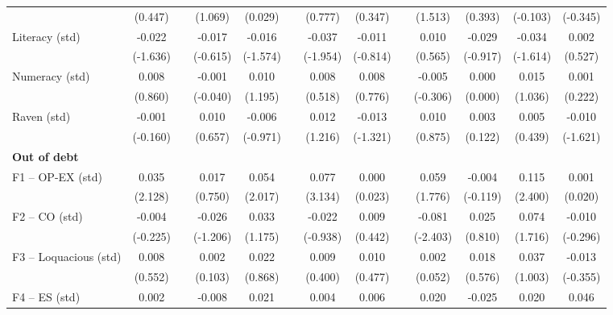 \begin{table}[htbp]
{\begin{tabular}{lcccccccccccc}
          & (0.447) &       & (1.069) & (0.029) &       & (0.777) & (0.347) &       & (1.513) & (0.393) & (-0.103) & (-0.345) \\
    Literacy (std) & -0.022 &       & -0.017 & -0.016 &       & \cellcolor[rgb]{ 1,  1,  0}-0.037 & -0.011 &       & 0.010 & -0.029 & -0.034 & 0.002 \\
          & (-1.636) &       & (-0.615) & (-1.574) &       & (-1.954) & (-0.814) &       & (0.565) & (-0.917) & (-1.614) & (0.527) \\
    Numeracy (std) & 0.008 &       & -0.001 & 0.010 &       & 0.008 & 0.008 &       & -0.005 & 0.000 & 0.015 & 0.001 \\
          & (0.860) &       & (-0.040) & (1.195) &       & (0.518) & (0.776) &       & (-0.306) & (0.000) & (1.036) & (0.222) \\
    Raven (std) & -0.001 &       & 0.010 & -0.006 &       & 0.012 & -0.013 &       & 0.010 & 0.003 & 0.005 & -0.010 \\
          & (-0.160) &       & (0.657) & (-0.971) &       & (1.216) & (-1.321) &       & (0.875) & (0.122) & (0.439) & (-1.621) \\
    \midrule
    \textbf{Out of debt} &       &       &       &       &       &       &       &       &       &       &       &  \\
    F1 -- OP-EX (std) & \cellcolor[rgb]{ 1,  1,  0}0.035 &       & 0.017 & \cellcolor[rgb]{ 1,  1,  0}0.054 &       & \cellcolor[rgb]{ 1,  1,  0}0.077 & 0.000 &       & \cellcolor[rgb]{ 1,  1,  0}0.059 & -0.004 & \cellcolor[rgb]{ 1,  1,  0}0.115 & 0.001 \\
          & (2.128) &       & (0.750) & (2.017) &       & (3.134) & (0.023) &       & (1.776) & (-0.119) & (2.400) & (0.020) \\
    F2 -- CO (std) & -0.004 &       & -0.026 & 0.033 &       & -0.022 & 0.009 &       & \cellcolor[rgb]{ 1,  1,  0}-0.081 & 0.025 & 0.074 & -0.010 \\
          & (-0.225) &       & (-1.206) & (1.175) &       & (-0.938) & (0.442) &       & (-2.403) & (0.810) & (1.716) & (-0.296) \\
    F3 -- Loquacious (std) & 0.008 &       & 0.002 & 0.022 &       & 0.009 & 0.010 &       & 0.002 & 0.018 & 0.037 & -0.013 \\
          & (0.552) &       & (0.103) & (0.868) &       & (0.400) & (0.477) &       & (0.052) & (0.576) & (1.003) & (-0.355) \\
    F4 -- ES (std) & 0.002 &       & -0.008 & 0.021 &       & 0.004 & 0.006 &       & 0.020 & -0.025 & 0.020 & 0.046 \\

\end{tabular}}
\end{table}
